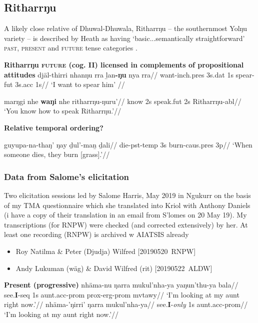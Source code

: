 \subsection{Ritharrŋu}

A likely close relative of Dhuwal-Dhuwala, Ritharrŋu -- the southernmost Yolŋu variety -- is described by Heath as having `basic...semantically straightforward' \textsc{past, present} and \textsc{future} tense categories \citeyearpar[74]{Heath1980}.



\pex\textbf{Ritharrŋu \textsc{future} (cog. II) licensed in complements of propositional attitudes}
\a\begingl\gla djäl-thirri nhanŋu rra ḻan\textbf{-ŋu} nya rra//
\glb want-\gls{inch}.\gls{pres} 3s.\gls{dat} 1s spear-\gls{fut} 3s.\gls{acc} 1s//
\glft `I want to spear him' //\endgl

\a\begingl\gla marŋgi nhe \textbf{waŋi} nhe ritharrŋu-ŋuru'//
\glb know 2s speak.\gls{fut} 2s Ritharrŋu-\gls{abl}//
\glft`You know how to speak Ritharrŋu.'//\endgl
\xe


\pex\textbf{Relative temporal ordering?}

\begingl\gla guyupa-na-thaŋ' ŋay ḏul'-maṉ ḏali//
\glb die-\gls{pst}-\gls{temp} 3s burn-\gls{caus}.\gls{pres} 3p//
\glft`When someone dies, they burn [grass].'//\endgl\xe

\subsubsection{Data from Salome's elicitation}

Two elicitation sessions led by Salome Harris, May 2019 in Ngukurr on the basis of my TMA questionnaire which she translated into Kriol with Anthony Daniels (i have a copy of their translation in an email from S'lomes on 20 May 19). My transcriptions (for RNPW) were checked (and corrected extensively) by her.
At least one recording (RNPW) is archived w AIATSIS already
\begin{itemize}
	\item Roy Natilma \& Peter (Djudja) Wilfred [20190520~RNPW]
	\item Andy Lukuman (wäg) \& David Wilfred (rit) [20190522~ALDW]
\end{itemize}

\pex \textbf{Present (progressive)}
\a\begingl\gla nhäma-nu ŋarra mukul'nha-ya yaŋun'thu-ya bala//
\glb see.\textbf{I}-\gls{seq} 1s aunt.\gls{acc}-\gls{prom} \gls{prox}-\gls{erg}-\gls{prom} \gls{mvtawy}//
\glft`I'm looking at my aunt right now.'\trailingcitation{[RN~20190520]}//\endgl
\a\begingl\gla nhäma-'ŋirri' ŋarra mukul'nha-ya//
\glb see.\textbf{I}-\textit{only} 1s aunt.\gls{acc}-\gls{prom}//
\glft`I'm looking at my aunt right now.'\trailingcitation{[AL~20190522~57s]}//\endgl
\xe


